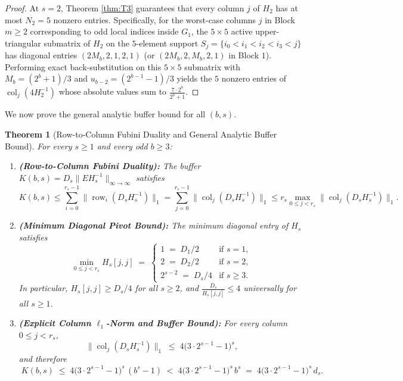 \documentclass[11pt,a4paper]{article}
\theoremstyle{plain}
\newtheorem{theorem}{Theorem}[section]
\theoremstyle{definition}
\newcommand{\row}{\operatorname{row}}
\newcommand{\col}{\operatorname{col}}
\begin{document}
\begin{proof}
At $s = 2$, Theorem \ref{thm:T3} guarantees that every column $j$ of $H_2$ has at most $N_2 = 5$ nonzero entries. Specifically, for the worst-case columns $j$ in Block $m \ge 2$ corresponding to odd local indices inside $G_1$, the $5 \times 5$ active upper-triangular submatrix of $H_2$ on the $5$-element support $S_j = \{i_0 < i_1 < i_2 < i_3 < j\}$ has diagonal entries $(2M_b, 2, 1, 2, 1)$ (or $(2M_b, 2, M_b, 2, 1)$ in Block $1$). Performing exact back-substitution on this $5 \times 5$ submatrix with $M_b = (2^b+1)/3$ and $u_{b-2} = (2^{b-1}-1)/3$ yields the $5$ nonzero entries of $\col_j(4 H_2^{-1})$ whose absolute values sum to $\frac{7 \cdot 2^b}{2^b+1}$.
\end{proof}

We now prove the general analytic buffer bound for all $(b,s)$.

\begin{theorem}[Row-to-Column Fubini Duality and General Analytic Buffer Bound]\label{thm:T6}
For every $s \ge 1$ and every odd $b \ge 3$:
\begin{enumerate}[label=(\alph*)]
\item \textbf{(Row-to-Column Fubini Duality):} The buffer $K(b,s) = D_s \|E H_s^{-1}\|_{\infty \to \infty}$ satisfies
\begin{equation}\label{eq:fubini}
K(b,s) \le \sum_{i=0}^{r_s-1} \|\row_i(D_s H_s^{-1})\|_1 = \sum_{j=0}^{r_s-1} \|\col_j(D_s H_s^{-1})\|_1 \le r_s \max_{0 \le j < r_s} \|\col_j(D_s H_s^{-1})\|_1.
\end{equation}
\item \textbf{(Minimum Diagonal Pivot Bound):} The minimum diagonal entry of $H_s$ satisfies
\begin{equation}\label{eq:min-diag}
\min_{0 \le j < r_s} H_s[j,j] \;=\; \begin{cases}
1 \;=\; D_1 / 2 & \text{if } s = 1, \\
2 \;=\; D_2 / 2 & \text{if } s = 2, \\
2^{s-2} \;=\; D_s / 4 & \text{if } s \ge 3.
\end{cases}
\end{equation}
In particular, $H_s[j,j] \ge D_s / 4$ for all $s \ge 2$, and $\frac{D_s}{H_s[j,j]} \le 4$ universally for all $s \ge 1$.
\item \textbf{(Explicit Column $\ell_1$-Norm and Buffer Bound):} For every column $0 \le j < r_s$,
\begin{equation}\label{eq:col-bound-general}
\|\col_j(D_s H_s^{-1})\|_1 \;\le\; 4\big(3 \cdot 2^{s-1} - 1\big)^s,
\end{equation}
and therefore
\begin{equation}\label{eq:K-bound-general}
\boxed{\; K(b,s) \;\le\; 4\big(3 \cdot 2^{s-1} - 1\big)^s \, (b^s - 1) \;<\; 4\big(3 \cdot 2^{s-1} - 1\big)^s \, b^s \;=\; 4\big(3 \cdot 2^{s-1} - 1\big)^s \, d_s. \;}
\end{equation}
\end{enumerate}
\end{theorem}
\end{document}
